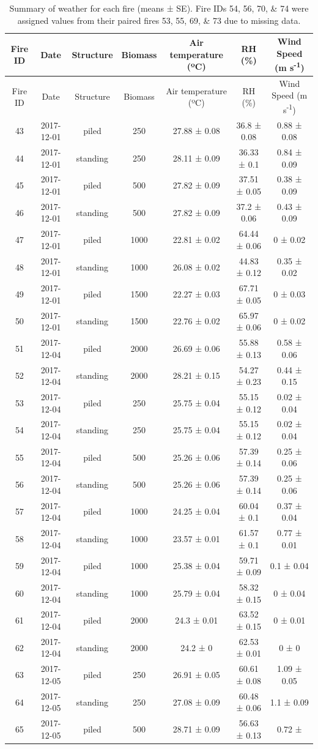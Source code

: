 \documentclass[11pt,a4paper]{article}
\begin{document}
\begin{longtable}[]{@{}ccccccc@{}}
\caption{Summary of weather for each fire (means ± SE). Fire IDs 54, 56,
70, \& 74 were assigned values from their paired fires 53, 55, 69, \& 73
due to missing data.}\tabularnewline
\toprule
Fire ID & Date & Structure & Biomass & Air temperature (ºC) & RH (\%) &
Wind Speed (m s\textsuperscript{-1})\tabularnewline
\midrule
\endfirsthead
\toprule
Fire ID & Date & Structure & Biomass & Air temperature (ºC) & RH (\%) &
Wind Speed (m s\textsuperscript{-1})\tabularnewline
\midrule
\endhead
43 & 2017-12-01 & piled & 250 & 27.88 ± 0.08 & 36.8 ± 0.08 & 0.88 ±
0.08\tabularnewline
44 & 2017-12-01 & standing & 250 & 28.11 ± 0.09 & 36.33 ± 0.1 & 0.84 ±
0.09\tabularnewline
45 & 2017-12-01 & piled & 500 & 27.82 ± 0.09 & 37.51 ± 0.05 & 0.38 ±
0.09\tabularnewline
46 & 2017-12-01 & standing & 500 & 27.82 ± 0.09 & 37.2 ± 0.06 & 0.43 ±
0.09\tabularnewline
47 & 2017-12-01 & piled & 1000 & 22.81 ± 0.02 & 64.44 ± 0.06 & 0 ±
0.02\tabularnewline
48 & 2017-12-01 & standing & 1000 & 26.08 ± 0.02 & 44.83 ± 0.12 & 0.35 ±
0.02\tabularnewline
49 & 2017-12-01 & piled & 1500 & 22.27 ± 0.03 & 67.71 ± 0.05 & 0 ±
0.03\tabularnewline
50 & 2017-12-01 & standing & 1500 & 22.76 ± 0.02 & 65.97 ± 0.06 & 0 ±
0.02\tabularnewline
51 & 2017-12-04 & piled & 2000 & 26.69 ± 0.06 & 55.88 ± 0.13 & 0.58 ±
0.06\tabularnewline
52 & 2017-12-04 & standing & 2000 & 28.21 ± 0.15 & 54.27 ± 0.23 & 0.44 ±
0.15\tabularnewline
53 & 2017-12-04 & piled & 250 & 25.75 ± 0.04 & 55.15 ± 0.12 & 0.02 ±
0.04\tabularnewline
54 & 2017-12-04 & standing & 250 & 25.75 ± 0.04 & 55.15 ± 0.12 & 0.02 ±
0.04\tabularnewline
55 & 2017-12-04 & piled & 500 & 25.26 ± 0.06 & 57.39 ± 0.14 & 0.25 ±
0.06\tabularnewline
56 & 2017-12-04 & standing & 500 & 25.26 ± 0.06 & 57.39 ± 0.14 & 0.25 ±
0.06\tabularnewline
57 & 2017-12-04 & piled & 1000 & 24.25 ± 0.04 & 60.04 ± 0.1 & 0.37 ±
0.04\tabularnewline
58 & 2017-12-04 & standing & 1000 & 23.57 ± 0.01 & 61.57 ± 0.1 & 0.77 ±
0.01\tabularnewline
59 & 2017-12-04 & piled & 1000 & 25.38 ± 0.04 & 59.71 ± 0.09 & 0.1 ±
0.04\tabularnewline
60 & 2017-12-04 & standing & 1000 & 25.79 ± 0.04 & 58.32 ± 0.15 & 0 ±
0.04\tabularnewline
61 & 2017-12-04 & piled & 2000 & 24.3 ± 0.01 & 63.52 ± 0.15 & 0 ±
0.01\tabularnewline
62 & 2017-12-04 & standing & 2000 & 24.2 ± 0 & 62.53 ± 0.01 & 0 ±
0\tabularnewline
63 & 2017-12-05 & piled & 250 & 26.91 ± 0.05 & 60.61 ± 0.08 & 1.09 ±
0.05\tabularnewline
64 & 2017-12-05 & standing & 250 & 27.08 ± 0.09 & 60.48 ± 0.06 & 1.1 ±
0.09\tabularnewline
65 & 2017-12-05 & piled & 500 & 28.71 ± 0.09 & 56.63 ± 0.13 & 0.72 ±

\end{longtable}
\end{document}
